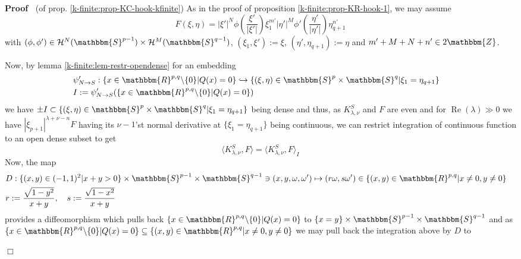 \documentclass{article}
\newcommand{\assign}{:=}
\newcommand{\tmop}[1]{\ensuremath{\operatorname{#1}}}
\newenvironment{proof}{\noindent\textbf{Proof\ }}{\hspace*{\fill}$\Box$\medskip}
\numberwithin{definition}{section}
\numberwithin{lemma}{section}
\numberwithin{proposition}{section}
{\theorembodyfont{\rmfamily}\newtheorem{remark}{Remark}
\numberwithin{remark}{section}
}
\begin{document}
\begin{proof}
  (of prop. \ref{k-finite:prop-KC-hook-kfinite}) As in the proof of
  proposition \ref{k-finite:prop-KR-hook-1}, we may assume
  \[ F ( \xi, \eta) = | \xi' |^N \phi \left( \frac{\xi'}{| \xi' |} \right)
     \xi_1^{m'} | \eta' |^M \phi' \left( \frac{\eta'}{| \eta' |} \right)
     \eta_{q + 1}^{n'} \]
  with $( \phi, \phi') \in \mathcal{H}^N ( \mathbbm{S}^{p - 1}) \times
  \mathcal{H}^M ( \mathbbm{S}^{q - 1})$, $( \xi_1, \xi') \assign \xi$, $(
  \eta', \eta_{q + 1}) \assign \eta$ and $m' + M + N + n' \in 2\mathbbm{Z}$.
  
  Now, by lemma \ref{k-finite:lem-restr-opendense} for an embedding
  \begin{eqnarray}
    & \psi_{N \rightarrow S}' : \{ x \in \mathbbm{R}^{p, q} \backslash \{ 0
    \} | Q ( x) = 0 \} \hookrightarrow \{ ( \xi, \eta) \in \mathbbm{S}^p
    \times \mathbbm{S}^q | \xi_1 = \eta_{q + 1} \} &  \nonumber\\
    & I \assign \psi'_{N \rightarrow S} ( \{ x \in \mathbbm{R}^{p, q}
    \backslash \{ 0 \} | Q ( x) = 0 \}) &  \nonumber
  \end{eqnarray}
  we have $\pm I \subset \{ ( \xi, \eta) \in \mathbbm{S}^p \times
  \mathbbm{S}^q | \xi_1 = \eta_{q + 1} \}$ being dense and thus, as
  $K_{\lambda, \nu}^S$ and $F$ are even and for $\tmop{Re} ( \lambda) \gg 0$
  we have $| \xi_{p + 1} |^{\lambda + \nu - n} F$ having its $\nu - 1$'st
  normal derivative at $\{ \xi_1 = \eta_{q + 1} \}$ being continuous, we can
  restrict integration of continuous function to an open dense subset to get
  \[ \langle K_{\lambda, \nu}^S, F \rangle = \langle K_{\lambda, \nu}^S, F
     \rangle_I \]
  Now, the map
  \begin{eqnarray}
    & D : \{ ( x, y) \in ( - 1, 1)^2 | x + y > 0 \} \times \mathbbm{S}^{p -
    1} \times \mathbbm{S}^{q - 1} \ni ( x, y, \omega, \omega') \mapsto ( r
    \omega, s \omega') \in \{ ( x, y) \in \mathbbm{R}^{p, q} | x \neq 0, y
    \neq 0 \} &  \nonumber\\
    & r : = \frac{\sqrt{1 - y^2}}{x + y}, \hspace{1em} s : = \frac{\sqrt{1 -
    x^2}}{x + y} &  \nonumber
  \end{eqnarray}
  provides a diffeomorphism which pulls back $\{ x \in \mathbbm{R}^{p, q}
  \backslash \{ 0 \} | Q ( x) = 0 \}$ to $\{ x = y \} \times \mathbbm{S}^{p -
  1} \times \mathbbm{S}^{q - 1}$ and as $\{ x \in \mathbbm{R}^{p, q}
  \backslash \{ 0 \} | Q ( x) = 0 \} \subseteq \{ ( x, y) \in \mathbbm{R}^{p,
  q} | x \neq 0, y \neq 0 \}$ we may pull back the integration above by $D$ to

\end{proof}
\end{document}
